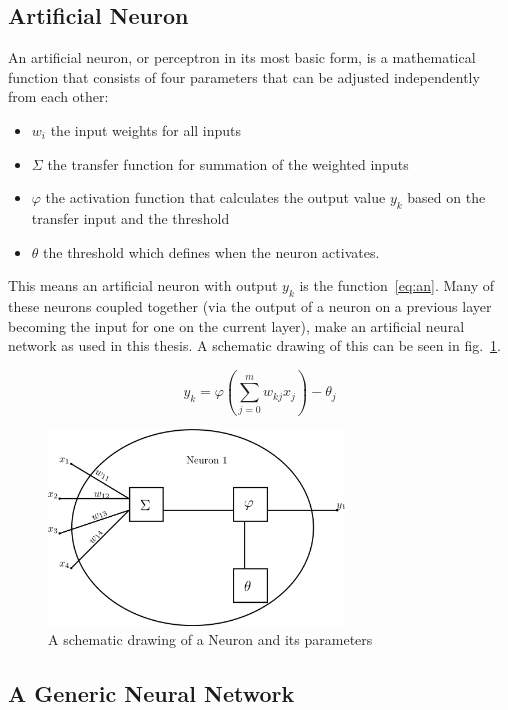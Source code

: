 \subsection{Artificial Neuron}
\label{sec:fund:AN}

An artificial neuron, or perceptron in its most basic form, is a mathematical function that consists of four parameters that can be adjusted independently from each other:
\begin{itemize}
\item \(w_i\) the input weights for all inputs
\item \(\Sigma\) the transfer function for summation of the weighted inputs
\item \(\varphi\) the activation function that calculates the output value \(y_k\) based on the transfer input and the threshold
\item \(\theta\) the threshold which defines when the neuron activates.
\end{itemize}

This means an artificial neuron with output \(y_k\) is the function~\ref{eq:an}. Many of these neurons coupled together (via the output of a neuron on a previous layer becoming the input for one on the current layer), make an artificial neural network as used in this thesis. A schematic drawing of this can be seen in fig.~\ref{fig:neuron}.

\begin{equation}
y_k = \varphi(\sum_{j=0}^{m} w_{kj}x_j) - \theta_j
\label{eq:an}
\end{equation}

\begin{figure}[h!]
\label{fig:neuron}
\caption{A schematic drawing of a Neuron and its parameters}
\centering
\includegraphics[width=0.7\textwidth]{images/neuron.png}
\end{figure}

\subsection{A Generic Neural Network}
\label{sec:fund:netSetup}

